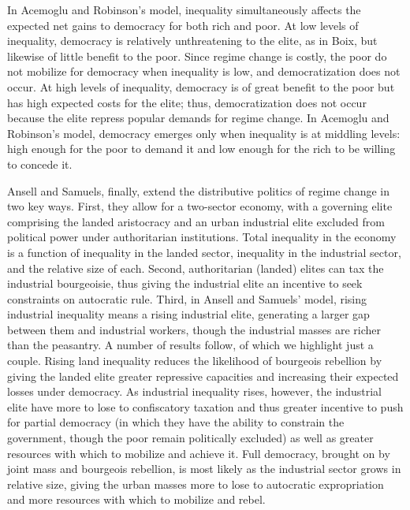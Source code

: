 \documentclass[12pt,]{book}
\begin{document}
In Acemoglu and Robinson's model, inequality simultaneously affects the expected net gains to democracy for both rich and poor. At low levels of inequality, democracy is relatively unthreatening to the elite, as in Boix, but likewise of little benefit to the poor. Since regime change is costly, the poor do not mobilize for democracy when inequality is low, and democratization does not occur. At high levels of inequality, democracy is of great benefit to the poor but has high expected costs for the elite; thus, democratization does not occur because the elite repress popular demands for regime change. In Acemoglu and Robinson's model, democracy emerges only when inequality is at middling levels: high enough for the poor to demand it and low enough for the rich to be willing to concede it.

Ansell and Samuels, finally, extend the distributive politics of regime change in two key ways. First, they allow for a two-sector economy, with a governing elite comprising the landed aristocracy and an urban industrial elite excluded from political power under authoritarian institutions. Total inequality in the economy is a function of inequality in the landed sector, inequality in the industrial sector, and the relative size of each. Second, authoritarian (landed) elites can tax the industrial bourgeoisie, thus giving the industrial elite an incentive to seek constraints on autocratic rule. Third, in Ansell and Samuels' model, rising industrial inequality means a rising industrial elite, generating a larger gap between them and industrial workers, though the industrial masses are richer than the peasantry. A number of results follow, of which we highlight just a couple. Rising land inequality reduces the likelihood of bourgeois rebellion by giving the landed elite greater repressive capacities and increasing their expected losses under democracy. As industrial inequality rises, however, the industrial elite have more to lose to confiscatory taxation and thus greater incentive to push for partial democracy (in which they have the ability to constrain the government, though the poor remain politically excluded) as well as greater resources with which to mobilize and achieve it. Full democracy, brought on by joint mass and bourgeois rebellion, is most likely as the industrial sector grows in relative size, giving the urban masses more to lose to autocratic expropriation and more resources with which to mobilize and rebel.
\end{document}
